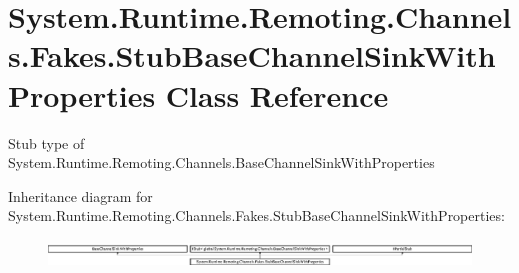 \hypertarget{class_system_1_1_runtime_1_1_remoting_1_1_channels_1_1_fakes_1_1_stub_base_channel_sink_with_properties}{\section{System.\-Runtime.\-Remoting.\-Channels.\-Fakes.\-Stub\-Base\-Channel\-Sink\-With\-Properties Class Reference}
\label{class_system_1_1_runtime_1_1_remoting_1_1_channels_1_1_fakes_1_1_stub_base_channel_sink_with_properties}
}


Stub type of System.\-Runtime.\-Remoting.\-Channels.\-Base\-Channel\-Sink\-With\-Properties 


Inheritance diagram for System.\-Runtime.\-Remoting.\-Channels.\-Fakes.\-Stub\-Base\-Channel\-Sink\-With\-Properties\-:\begin{figure}[H]
\begin{center}
\leavevmode
\includegraphics[height=0.754209cm]{class_system_1_1_runtime_1_1_remoting_1_1_channels_1_1_fakes_1_1_stub_base_channel_sink_with_properties}
\end{center}
\end{figure}
